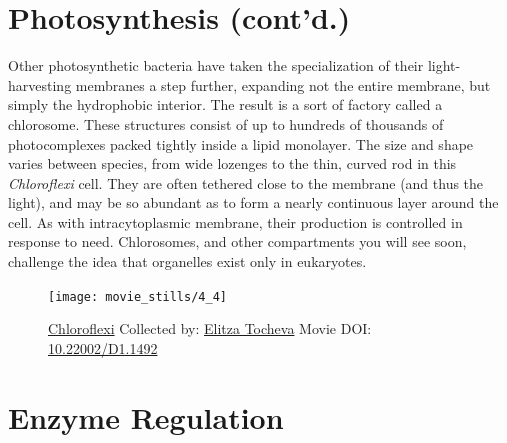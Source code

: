 \documentclass[]{tufte-book}
\begin{document}
\section{Photosynthesis (cont'd.)}\label{photosynthesis-contd.}

Other photosynthetic bacteria have taken the specialization of their
light-harvesting membranes a step further, expanding not the entire
membrane, but simply the hydrophobic interior. The result is a sort of
factory called a chlorosome. These structures consist of up to hundreds
of thousands of photocomplexes packed tightly inside a lipid monolayer.
The size and shape varies between species, from wide lozenges to the
thin, curved rod in this \emph{Chloroflexi} cell. They are often
tethered close to the membrane (and thus the light), and may be so
abundant as to form a nearly continuous layer around the cell. As with
intracytoplasmic membrane, their production is controlled in response to
need. Chlorosomes, and other compartments you will see soon, challenge
the idea that organelles exist only in eukaryotes.





\begin{figure}
\texttt{[image: movie\_stills/4\_4]} \caption[\protect\hyperlink{tree}{Chloroflexi} Collected by:
\protect\hyperlink{elitza_tocheva}{Elitza Tocheva} Movie DOI:
\href{https://doi.org/10.22002/D1.1492}{10.22002/D1.1492}]{\protect\hyperlink{tree}{Chloroflexi} Collected by:
\protect\hyperlink{elitza_tocheva}{Elitza Tocheva} Movie DOI:
\href{https://doi.org/10.22002/D1.1492}{10.22002/D1.1492}}\label{fig:4-4}
\end{figure}

\section{Enzyme Regulation}\label{enzyme-regulation}
\end{document}
